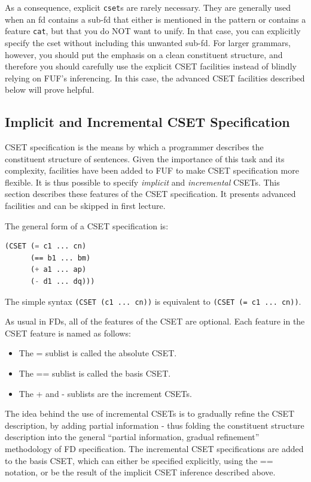 \documentclass[10pt,a4paper]{report}
\begin{document}
As a consequence, explicit {\tt cset}s are rarely necessary.  They are
generally used when an fd contains a sub-fd that either is mentioned in the
pattern or contains a feature {\tt cat}, but that you do NOT want to unify.
In that case, you can explicitly specify the cset without including this
unwanted sub-fd.  For larger grammars, however, you should put the emphasis
on a clean constituent structure, and therefore you should carefully use
the explicit CSET facilities instead of blindly relying on FUF's
inferencing.  In this case, the advanced CSET facilities described below
will prove helpful.

\subsection{Implicit and Incremental CSET Specification}
\label{incr-cset}

CSET specification is the means by which a programmer describes the
constituent structure of sentences.  Given the importance of this task and
its complexity, facilities have been added to FUF to make CSET
specification more flexible.  It is thus possible to specify {\em implicit}
and {\em incremental} CSETs.  This section describes these features of the
CSET specification.  It presents advanced facilities and can be skipped in
first lecture.

The general form of a CSET specification is:
\begin{lstlisting}[language=Lisp]
(CSET (= c1 ... cn)
      (== b1 ... bm)
      (+ a1 ... ap)
      (- d1 ... dq)))
\end{lstlisting}

The simple syntax {\tt (CSET (c1 ... cn))} is equivalent to 
{\tt (CSET (= c1 ... cn))}. 

As usual in FDs, all of the features of the CSET are optional.
Each feature in the CSET feature is named as follows:
\begin{itemize}
\item The = sublist is called the absolute CSET.  

\item The == sublist is called the basis CSET.

\item The + and - sublists are the increment CSETs.
\end{itemize}

The idea behind the use of incremental CSETs is to gradually refine the
CSET description, by adding partial information - thus folding the
constituent structure description into the general ``partial information,
gradual refinement'' methodology of FD specification.  The incremental CSET
specifications are added to the basis CSET, which can either be specified 
explicitly, using the == notation, or be the result of the implicit CSET
inference described above.
\end{document}
